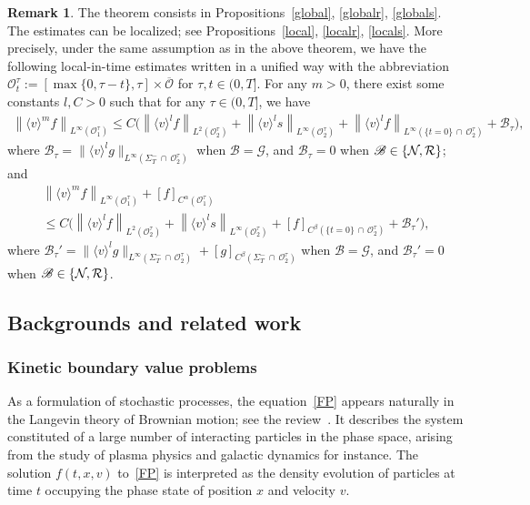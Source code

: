 \documentclass[10pt]{amsart}
\theoremstyle{definition}\newtheorem{defi}[theo]{Definition}\newtheorem{rema}[theo]{Remark}\newtheorem{exam}[theo]{Example}\newtheorem{exem}[theo]{Example}\newtheorem{nota}[theo]{Notation}
\newcommand*\NN {{\mathcal{N}\hspace{-.3mm}}}
\newcommand*\Gi {\mathcal{G}}
\newcommand*\BB {\mathscr{B}}
\newcommand{\clB}{\mathcal{B}}
\newcommand*\RR {\mathcal{R}}
\newcommand*\OO {\mathcal{O}}
\newcommand{\lv}{\langle v\rangle}
\begin{document}
\begin{rema}
The theorem consists in Propositions~\ref{global}, \ref{globalr}, \ref{globals}. The estimates can be localized; see Propositions~\ref{local}, \ref{localr}, \ref{locals}. More precisely, under the same assumption as in the above theorem, we have the following local-in-time estimates written in a unified way with the abbreviation $\OO_t^\tau:=[\max\{0,\tau-t\},\tau]\times\overline{\OO}$ for $\tau,t\in(0,T]$. For any $m>0$, there exist some constants $l,C>0$ such that for any $\tau\in(0,T]$, we have
\begin{align*}
\left\|\lv^mf\right\|_{L^\infty(\OO_1^\tau)}
\le C \big(\left\|\lv^{l} f\right\|_{L^2(\OO_2^\tau)}+ \left\|\lv^{l}s\right\|_{L^\infty(\OO_2^\tau)}+ \left\|\lv^{l}f\right\|_{L^\infty\left(\{t=0\}\,\cap\,\OO_2^\tau\right)} +\clB_\tau \big),
\end{align*}
where $\clB_\tau=\|\lv^lg\|_{L^\infty(\Sigma_T^-\,\cap\,\OO_2^\tau)}$ when $\BB=\Gi$, and $\clB_\tau=0$ when $\BB\in\{\NN,\RR\}$; and
\begin{multline*}
\left\|\lv^mf\right\|_{L^\infty(\OO_1^\tau)} + [f]_{C^\alpha(\OO_1^\tau)}\\
\le C\big(\left\|\lv^{l} f\right\|_{L^2(\OO_2^\tau)}+ \left\|\lv^ls\right\|_{L^\infty(\OO_2^\tau)} +[f]_{C^\beta\left(\{t=0\}\,\cap\,\OO_2^\tau\right)} +\clB_\tau' \big),
\end{multline*}
where $\clB_\tau'=\|\lv^lg\|_{L^\infty(\Sigma_T^-\,\cap\,\OO_2^\tau)}+[g]_{C^\beta(\Sigma_T^-\,\cap\,\OO_2^\tau)}$ when $\BB=\Gi$, and $\clB_\tau'=0$ when $\BB\in\{\NN,\RR\}$.
\end{rema}

\subsection{Backgrounds and related work}
\subsubsection{Kinetic boundary value problems} 

As a formulation of stochastic processes, the equation~\eqref{FP} appears naturally in the Langevin theory of Brownian motion; see the review~\cite{Chand}. It describes the system constituted of a large number of interacting particles in the phase space, arising from the study of plasma physics and galactic dynamics for instance. The solution $f(t,x,v)$ to~\eqref{FP} is interpreted as the density evolution of particles at time $t$ occupying the phase state of position $x$ and velocity $v$.
\end{document}
